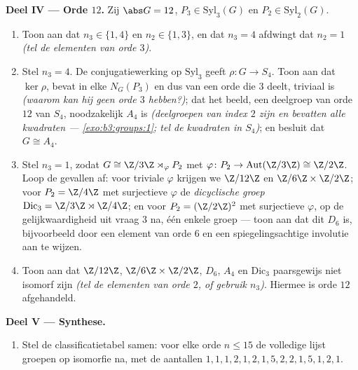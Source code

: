 \begin{problem}
\medskip
\noindent\textbf{Deel IV --- Orde $12$.} Zij $\abs G = 12$, $P_3
\in \mathrm{Syl}_3(G)$ en $P_2 \in \mathrm{Syl}_2(G)$.
\begin{enumerate}[resume]
  \item Toon aan dat $n_3 \in \{1, 4\}$ en $n_2 \in \{1, 3\}$, en
        dat $n_3 = 4$ afdwingt dat $n_2 = 1$ \emph{(tel de
        elementen van orde $3$)}.
  \item Stel $n_3 = 4$. De conjugatiewerking op $\mathrm{Syl}_3$
        geeft $\rho \colon G \to S_4$. Toon aan dat $\ker \rho$,
        bevat in elke $N_G(P_3)$ en dus van een orde die $3$ deelt,
        triviaal is \emph{(waarom kan hij geen orde $3$ hebben?)};
        dat het beeld, een deelgroep van orde $12$ van $S_4$,
        noodzakelijk $A_4$ is \emph{(deelgroepen van index $2$ zijn
         en bevatten alle kwadraten ---
        \cref{exo:b3:groups:1}; tel de kwadraten in $S_4$)}; en
        besluit dat $G \cong A_4$.
  \item Stel $n_3 = 1$, zodat $G \cong \Z/3\Z \rtimes_\varphi P_2$
        met $\varphi \colon P_2 \to \operatorname{Aut}(\Z/3\Z)
        \cong \Z/2\Z$. Loop de gevallen af: voor triviale $\varphi$
        krijgen we $\Z/12\Z$ en $\Z/6\Z \times \Z/2\Z$; voor $P_2 =
        \Z/4\Z$ met surjectieve $\varphi$ de \emph{dicyclische
        groep} $\mathrm{Dic}_3 = \Z/3\Z \rtimes \Z/4\Z$; en voor
        $P_2 = (\Z/2\Z)^2$ met surjectieve $\varphi$, op de
        gelijkwaardigheid uit vraag 3 na, één enkele groep --- toon
        aan dat dit $D_6$ is, bijvoorbeeld door een element van
        orde $6$ en een spiegelingsachtige involutie aan te wijzen.
  \item Toon aan dat $\Z/12\Z$, $\Z/6\Z \times \Z/2\Z$, $D_6$,
        $A_4$ en $\mathrm{Dic}_3$ paarsgewijs niet isomorf zijn
        \emph{(tel de elementen van orde $2$, of gebruik $n_3$)}.
        Hiermee is orde $12$ afgehandeld.
\end{enumerate}

\medskip
\noindent\textbf{Deel V --- Synthese.}
\begin{enumerate}[resume]
  \item Stel de classificatietabel samen: voor elke orde $n \leq
        15$ de volledige lijst groepen op isomorfie na, met de
        aantallen $1, 1, 1, 2, 1, 2, 1, 5, 2, 2, 1, 5, 1, 2, 1$.
\end{enumerate}


\end{problem}
